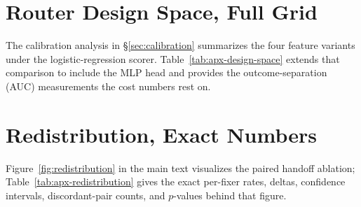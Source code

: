 \section{Router Design Space, Full Grid}
\label{apx:design-space}

The calibration analysis in \S\ref{sec:calibration} summarizes the four
feature variants under the logistic-regression scorer.
Table~\ref{tab:apx-design-space} extends that comparison to include the MLP
head and provides the outcome-separation (AUC) measurements the cost numbers
rest on.

\begin{table}[H]
\centering
\footnotesize
\caption{\textbf{The complete router design space.}
\emph{Top:} held-out cost saving for every feature-set $\times$ scorer
combination, all pinned to solve rate $.606$.  Adding hidden states helps
under both scorers; handoff-text features collapse savings to
$8$--$9\%$.  The MLP halves every variant's saving.  At $N{=}99$ the
best variant is only $3/5$ fold-stable.  \emph{Bottom:} the hidden
state separates solved from failed tasks at AUC~$.600$, while
handoff-text embedding sits at chance.}
\label{tab:apx-design-space}

\end{table}



\section{Redistribution, Exact Numbers}
\label{apx:redistribution}

Figure~\ref{fig:redistribution} in the main text visualizes the paired
handoff ablation; Table~\ref{tab:apx-redistribution} gives the exact per-fixer
rates, deltas, confidence intervals, discordant-pair counts, and $p$-values
behind that figure.

\begin{table}[H]
\centering
\footnotesize
\caption{\textbf{The handoff pattern is redistributive, not additive.}
Exact per-fixer rates, deltas, and $p$-values behind
Figure~\ref{fig:redistribution} ($99$ paired tasks, $396$ attempts).
The three weaker fixers gain and the strongest loses; pooled effect is
$+1.8$\,pp with CI including zero.  No fixer reaches $p<0.05$; every
row is directional only.  $b$~counts rescued tasks, $c$~counts broken
ones.}
\label{tab:apx-redistribution}

\end{table}



